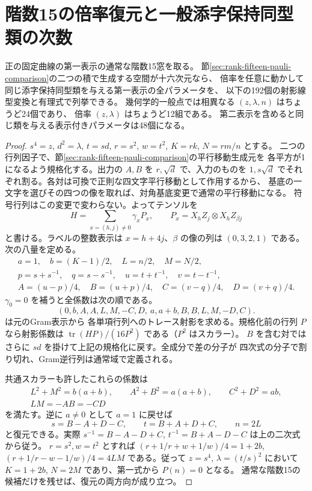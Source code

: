 \section{階数15の倍率復元と一般添字保持同型類の次数}
\label{sec:rank-fifteen-parameter-orbits}
\begin{theorem}\label{thm:rank-fifteen-parameter-orbits}
正の固定曲線の第一表示の通常な階数15窓を取る。
節\ref{sec:rank-fifteen-pauli-comparison}の二つの積で生成する空間が十六次元なら、
倍率を任意に動かして同じ添字保持同型類を与える第一表示の全パラメータを、
以下の192個の射影線型変換と有理式で列挙できる。
幾何学的一般点では相異なる $(z,\lambda,n)$ はちょうど24個であり、
倍率 $(z,\lambda)$ はちょうど12組である。
第二表示を含めると同じ類を与える表示付きパラメータは48個になる。
\end{theorem}
\begin{proof}
$s^4=z$, $d^2=\lambda$, $t=sd$, $r=s^2$, $w=t^2$, $K=rk$, $N=rm/n$ とする。
二つの行列因子で、節\ref{sec:rank-fifteen-pauli-comparison}の平行移動生成元を
各平方が1になるよう規格化する。出力の $A,B$ を $r,\sqrt d$ で、入力のものを
$1,s\sqrt d$ でそれぞれ割る。各対は可換で正則な四文字平行移動として作用するから、
基底の一文字を選びその四つの像を取れば、対角基底変更で通常の平行移動になる。
符号行列はこの変更で変わらない。よってテンソルを
\[
 H=\sum_{x=(h,j)\ne0}\gamma_x P_x,\qquad
 P_x=X_h Z_j\otimes X_h Z_{\beta j}
\]
と書ける。ラベルの整数表示は $x=h+4j$、$\beta$ の像の列は $(0,3,2,1)$ である。
次の八量を定める。
\[
 \begin{gathered}
 a=1,\quad b=(K-1)/2,\quad L=n/2,\quad M=N/2,\\
 p=s+s^{-1},\quad q=s-s^{-1},\quad u=t+t^{-1},\quad v=t-t^{-1},\\
 A=(u-p)/4,\quad B=(u+p)/4,\quad C=(v-q)/4,\quad D=(v+q)/4 .
 \end{gathered}
\]
$\gamma_0=0$ を補うと全係数は次の順である。
\[
 (0,b,A,A,L,M,-C,D,\ a,a+b,B,B,L,M,-D,C).
\]
 は元のGram表示から
各単項行列へのトレース射影を求める。規格化前の行列 $P$ なら射影係数は
$\operatorname{tr}(HP)/(16P^2)$ である（$P^2$ はスカラー）。
$B$ を含む対ではさらに $sd$ を掛けて上記の規格化に戻す。全成分で差の分子が
四次式の分子で割り切れ、Gram逆行列は通常域で定義される。

共通スカラーも許したこれらの係数は
\[
 \begin{gathered}
 L^2+M^2=b(a+b),\qquad A^2+B^2=a(a+b),\qquad C^2+D^2=ab,\\
 LM=-AB=-CD
 \end{gathered}
\]
を満たす。逆に $a\ne0$ として $a=1$ に戻せば
\[
 s=B-A+D-C,\qquad t=B+A+D+C,\qquad n=2L
\]
と復元できる。実際 $s^{-1}=B-A-D+C$, $t^{-1}=B+A-D-C$ は上の二次式から従う。
$r=s^2,w=t^2$ とすれば $(r+1/r+w+1/w)/4=1+2b$,
$(r+1/r-w-1/w)/4=4LM$ である。従って $z=s^4$, $\lambda=(t/s)^2$ において
$K=1+2b$, $N=2M$ であり、第一式から $P(n)=0$ となる。
通常な階数15の候補だけを残せば、復元の両方向が成り立つ。


\end{proof}
